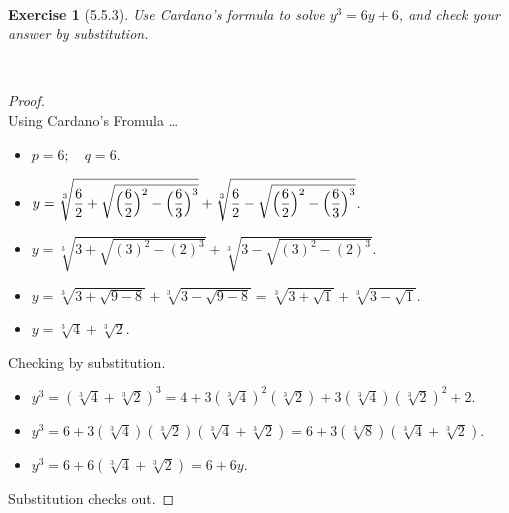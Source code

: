 \documentclass[12pt]{article}
\newcommand{\XB}{\color{black}}
\newcommand{\XBB}{\color{blue}}
\newcommand{\ds}{\displaystyle}
\theoremstyle{plain}
\newtheorem{ex}{Exercise}
\begin{document}
\newpage

\XBB\hrulefill\XB \\
\begin{ex} [5.5.3]
  Use Cardano's formula to solve $ y^{3} = 6y + 6 $, and check your answer by substitution.
\end{ex}
\XBB\hrulefill\XB \\

\begin{proof}
  \ \\

  Using Cardano's Fromula \dots


  \begin{itemize}
    \item $ \ds p = 6 ; \quad q = 6 $.
    \item $ \ds y = \sqrt[3]{ \ds \frac{6}{2} + \sqrt{ \ds \Bigl( \frac{6}{2} \Bigr)^{2} - \Bigl( \frac{6}{3} \Bigr)^{3} }} + \sqrt[3]{ \ds \frac{6}{2} - \sqrt{ \ds \Bigl( \frac{6}{2} \Bigr)^{2} - \Bigl( \frac{6}{3} \Bigr)^{3} }} $.
    \item $ \ds y = \sqrt[3]{ \ds 3 + \sqrt{ \ds ( 3 )^{2} - ( 2 )^{3} }} + \sqrt[3]{ \ds 3 - \sqrt{ \ds ( 3 )^{2} - ( 2 )^{3} }} $.
    \item $ \ds y = \sqrt[3]{ \ds 3 + \sqrt{ \ds 9 - 8 }} + \sqrt[3]{ \ds 3 - \sqrt{ \ds 9 - 8 }} = \sqrt[3]{ \ds 3 + \sqrt{ \ds 1 }} + \sqrt[3]{ \ds 3 - \sqrt{ \ds 1 }} $.
    \item $ \ds y = \sqrt[3]{ \ds 4 } + \sqrt[3]{ \ds 2 } $.
  \end{itemize}

  Checking by substitution.

  \begin{itemize}
    \item $ \ds y^{3} = (\sqrt[3]{ \ds 4 } + \sqrt[3]{ \ds 2 })^{3} = 4 + 3(\sqrt[3]{ \ds 4 })^{2}(\sqrt[3]{ \ds 2 }) + 3(\sqrt[3]{ \ds 4 })(\sqrt[3]{ \ds 2 })^{2} + 2 $.
    \item $ \ds y^{3} = 6 + 3(\sqrt[3]{ \ds 4 })(\sqrt[3]{ \ds 2 })(\sqrt[3]{ \ds 4 } + \sqrt[3]{ \ds 2 }) = 6 + 3(\sqrt[3]{ \ds 8 })(\sqrt[3]{ \ds 4 } + \sqrt[3]{ \ds 2 }) $.
    \item $ \ds y^{3} = 6 + 6(\sqrt[3]{ \ds 4 } + \sqrt[3]{ \ds 2 }) = 6 + 6y $.
\end{itemize}

    Substitution checks out.

\end{proof}
\end{document}
